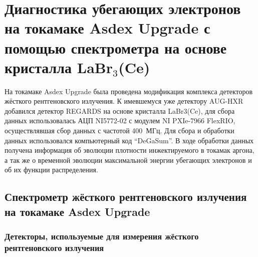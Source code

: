 \chapter{Диагностика убегающих электронов на токамаке Asdex Upgrade с помощью спектрометра на основе кристалла LaBr${}_3$(Ce)}
\label{ch:ch4}

На токамаке Asdex Upgrade была проведена модификация комплекса детекторов жёсткого рентгеновского излучения. К имевшемуся уже детектору AUG-HXR добавился детектор REGARDS на основе кристалла LaBr3(Ce), для сбора данных использовалась АЦП NI5772-02 с модулем NI PXIe-7966 FlexRIO, осуществлявшая сбор данных с частотой 400~МГц. Для сбора и обработки данных использовался компьютерный код ``DeGaSum''.  В ходе обработки данных получена информация об эволюции плотности инжектируемого в токамак аргона, а так же о временной эволюции максимальной энергии убегающих электронов и об их функции распределения.


\section{Спектрометр жёсткого рентгеновского излучения на токамаке Asdex Upgrade}

\subsection{Детекторы, используемые для измерения жёсткого рентгеновского излучения}

